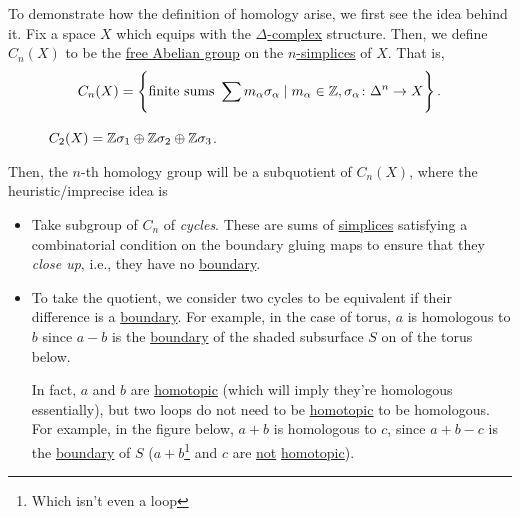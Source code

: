 To demonstrate how the definition of homology arise, we first see the idea behind it. Fix a space \(X\) which equips with the \hyperref[def:delta-complex]{\(\Delta\)-complex}
structure. Then, we define \(C_{n} (X)\) to be the \hyperref[def:free-Abelian-group]{free Abelian group} on the \hyperref[def:standard-simplex]{\(n\)-simplices} of \(X\). That is,
\[
	C_{n} (X) = \left\{\text{finite sums } \sum\limits_{}^{} m_\alpha \sigma _\alpha \mid m_\alpha \in \mathbb{\MakeUppercase{z}} , \sigma _\alpha \colon \Delta ^n\to X\right\}.
\]
\begin{figure}[H]
	\centering
	\caption{\(C_2(X) = \mathbb{\MakeUppercase{z}} \sigma _1 \oplus \mathbb{\MakeUppercase{z}} \sigma _2\oplus \mathbb{\MakeUppercase{z}} \sigma _3\).}
	\label{fig:C2-lec21}
\end{figure}
Then, the \(n\)-th homology group will be a subquotient of \(C_{n} (X)\), where the heuristic/imprecise idea is
\begin{itemize}
	\item Take subgroup of \(C_{n}\) of \emph{cycles}. These are sums of \hyperref[def:standard-simplex]{simplices} satisfying a combinatorial condition
	      on the boundary gluing maps to ensure that they \emph{close up}, i.e., they have no \hyperref[def:boundary]{boundary}.
	      \begin{figure}[H]
		      \centering
		      \label{fig:lec21-demo-of-homology-group}
	      \end{figure}
	\item To take the quotient, we consider two cycles to be equivalent if their difference is a \hyperref[def:boundary]{boundary}. For example, in
	      the case of torus, \(a\) is homologous to \(b\) since \(a - b\) is the \hyperref[def:boundary]{boundary} of the shaded subsurface \(S\) on
	      of the torus below.
	      \begin{figure}[H]
		      \centering
		      \label{fig:lec21-torus}
	      \end{figure}
	      In fact, \(a\) and \(b\) are \hyperref[def:homotopic]{homotopic} (which will imply they're homologous essentially), but two loops do not
	      need to be \hyperref[def:homotopic]{homotopic} to be homologous. For example, in the figure below, \(a+b\) is homologous to \(c\), since
	      \(a+b-c\) is the \hyperref[def:boundary]{boundary} of \(S\) (\(a+b\)\footnote{Which isn't even a loop} and \(c\) are \underline{not} \hyperref[def:homotopic]{homotopic}).
	      \begin{figure}[H]
		      \centering
		      \label{fig:lec21-3-torus}
	      \end{figure}
\end{itemize}

